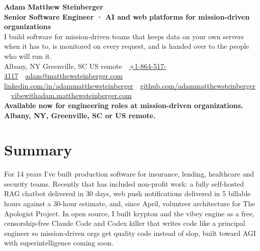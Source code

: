 \documentclass[10pt,letterpaper]{article}
\newcommand{\szname}{\fontsize{20pt}{24pt}\selectfont}
\newcommand{\sztitle}{\fontsize{10.5pt}{13pt}\selectfont}
\newcommand{\szbody}{\fontsize{9pt}{10.8pt}\selectfont}
\newcommand{\szmeta}{\fontsize{8pt}{10pt}\selectfont}
\begin{document}
\color{ink}\szbody

\begin{center}
{\szname\bfseries\color{primary} Adam Matthew Steinberger}\\[3pt]
{\sztitle\bfseries\color{accent} Senior Software Engineer · AI and web platforms for mission-driven organizations}\\[4pt]
{\szbody I build software for mission-driven teams that keeps data on your own servers when it has to, is monitored on every request, and is handed over to the people who will run it.}\\[6pt]
{\szmeta\color{muted} Albany, NY \textbullet{} Greenville, SC \textbullet{} US remote\ {\color{rulecolor}\textbar}\ \href{tel:+18645174117}{+1-864-517-4117}\ {\color{rulecolor}\textbar}\ \href{mailto:adam@matthewsteinberger.com}{adam@matthewsteinberger.com}}\\[2pt]
{\szmeta\color{muted} \href{https://www.linkedin.com/in/adammatthewsteinberger/}{linkedin.com/in/adammatthewsteinberger}\ {\color{rulecolor}\textbar}\ \href{https://github.com/adammatthewsteinberger}{github.com/adammatthewsteinberger}\ {\color{rulecolor}\textbar}\ \href{https://vibewithadam.matthewsteinberger.com}{vibewithadam.matthewsteinberger.com}}\\[6pt]
{\szbody\bfseries Available now for engineering roles at mission-driven organizations. Albany, NY, Greenville, SC or US remote.}
\end{center}
\vspace{-6pt}
\section*{Summary}
For 14 years I've built production software for insurance, lending, healthcare and security teams. Recently that has included non-profit work: a fully self-hosted RAG chatbot delivered in 30 days, web push notifications delivered in 5 billable hours against a 30-hour estimate, and, since April, volunteer architecture for The Apologist Project. In open source, I built krypton and the vibey engine as a free, censorship-free Claude Code and Codex killer that writes code like a principal engineer so mission-driven orgs get quality code instead of slop, built toward AGI with superintelligence coming soon.\par
\end{document}
